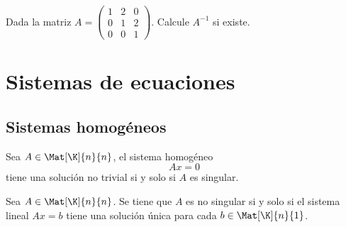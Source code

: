 \documentclass[compacto,10pt]{pubciencias-notas}
\begin{document}
\begin{ejer}\hspace{0pt} 
Dada la matriz $A = \begin{pmatrix}1&2&0\\0&1&2\\0&0&1\end{pmatrix}$. Calcule $A^{- 1}$ si existe.
\end{ejer}


\setcounter{section}{1}
\section{Sistemas de ecuaciones}
\setcounter{subsection}{3}
\subsection{Sistemas homogéneos}

\begin{teo}\label{Sem03Clas02CarcSisHom}
    Sea $A \in \Mat[\K]{n}{n}$, el sistema homogéneo 
    \[
        Ax = 0
    \]
    tiene una solución no trivial si y solo si $A$ es singular. 
\end{teo}

\begin{teo}\label{Sem03Clas02InvCat}
    Sea $A \in \Mat[\K]{n}{n}$. Se tiene que $A$ es no singular si y solo si el sistema lineal $Ax=b$ tiene una solución única para cada $b \in \Mat[\K]{n}{1}$.
\end{teo}
\end{document}

